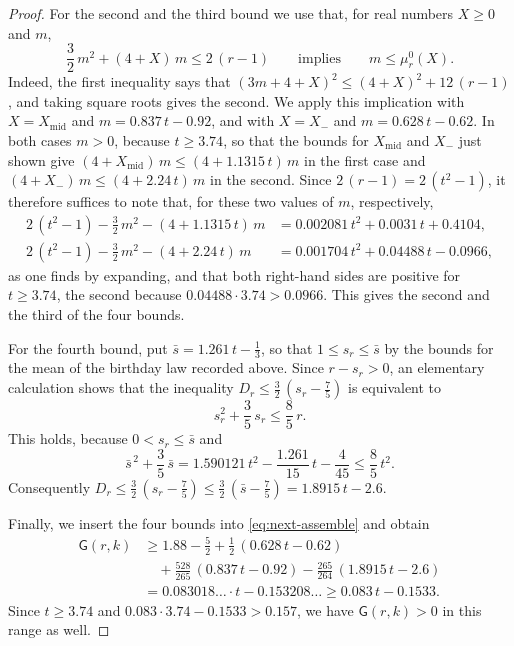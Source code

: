 \documentclass{amsart}
\makeatletter
\theoremstyle{definition}
\theoremstyle{remark}
\numberwithin{equation}{section}
\def\subsection{\@startsection{subsection}{2}\z@{.5\linespacing\@plus.7\linespacing}{-.5em}{\normalfont\bfseries\boldmath}}
\makeatother
\begin{document}
\begin{proof}
For the second and the third bound we use that, for real numbers $X\ge 0$ and $m$,
\[
\frac32\,m^2+(4+X)\,m\le 2\,(r-1)\qquad\text{implies}\qquad m\le\mu^0_r(X).
\]
Indeed, the first inequality says that $(3m+4+X)^2\le(4+X)^2+12\,(r-1)$, and taking square roots gives the second. We apply this implication with $X=X_{\mathrm{mid}}$ and $m=0.837\,t-0.92$, and with $X=X_-$ and $m=0.628\,t-0.62$. In both cases $m>0$, because $t\ge 3.74$, so that the bounds for $X_{\mathrm{mid}}$ and $X_-$ just shown give $(4+X_{\mathrm{mid}})\,m\le(4+1.1315\,t)\,m$ in the first case and $(4+X_-)\,m\le(4+2.24\,t)\,m$ in the second. Since $2\,(r-1)=2\,(t^2-1)$, it therefore suffices to note that, for these two values of $m$, respectively,
\begin{align*}
2\,(t^2-1)-\frac32\,m^2-(4+1.1315\,t)\,m&=0.002081\,t^2+0.0031\,t+0.4104,\\
2\,(t^2-1)-\frac32\,m^2-(4+2.24\,t)\,m&=0.001704\,t^2+0.04488\,t-0.0966,
\end{align*}
as one finds by expanding, and that both right-hand sides are positive for $t\ge 3.74$, the second because $0.04488\cdot 3.74>0.0966$. This gives the second and the third of the four bounds.

For the fourth bound, put $\bar s=1.261\,t-\frac13$, so that $1\le s_r\le\bar s$ by the bounds for the mean of the birthday law recorded above. Since $r-s_r>0$, an elementary calculation shows that the inequality $D_r\le\frac32\,(s_r-\frac75)$ is equivalent to
\[
s_r^2+\frac35\,s_r\le\frac85\,r .
\]
This holds, because $0<s_r\le\bar s$ and
\[
\bar s^{\,2}+\frac35\,\bar s=1.590121\,t^2-\frac{1.261}{15}\,t-\frac{4}{45}\le\frac85\,t^2 .
\]
Consequently $D_r\le\frac32\,(s_r-\frac75)\le\frac32\,(\bar s-\frac75)=1.8915\,t-2.6$.

Finally, we insert the four bounds into \eqref{eq:next-assemble} and obtain
\begin{align*}
\mathsf G(r,k)&\ge 1.88-\frac52+\frac12\,(0.628\,t-0.62)\\
&\quad+\frac{528}{265}\,(0.837\,t-0.92)-\frac{265}{264}\,(1.8915\,t-2.6)\\
&=0.083018\ldots\cdot t-0.153208\ldots\ge 0.083\,t-0.1533 .
\end{align*}
Since $t\ge 3.74$ and $0.083\cdot 3.74-0.1533>0.157$, we have $\mathsf G(r,k)>0$ in this range as well.
\end{proof}

\subsection{From a column to the next}\label{subsec:next-column}
\end{document}
